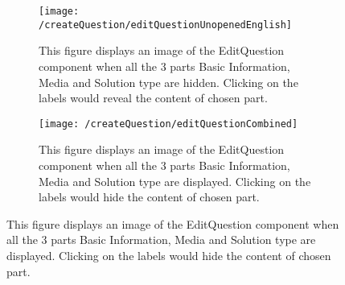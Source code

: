 \begin{figure}[H]
	\centering
	\begin{subfigure}{0.70\linewidth}
		\texttt{[image: /createQuestion/editQuestionUnopenedEnglish]}
		\caption{This figure displays an image of the EditQuestion component when all the 3 parts Basic Information, Media and Solution type are hidden. Clicking on the labels would reveal the content of chosen part.}
		\label{fig:editquestionUnopened}
	\end{subfigure}
	\begin{subfigure}{0.70\linewidth}
		\texttt{[image: /createQuestion/editQuestionCombined]}
		\caption{This figure displays an image of the EditQuestion component when all the 3 parts Basic Information, Media and Solution type are displayed. Clicking on the labels would hide the content of chosen part.}
		\label{fig:editquestionOpened}
	\end{subfigure}
\end{figure}
\noindent

